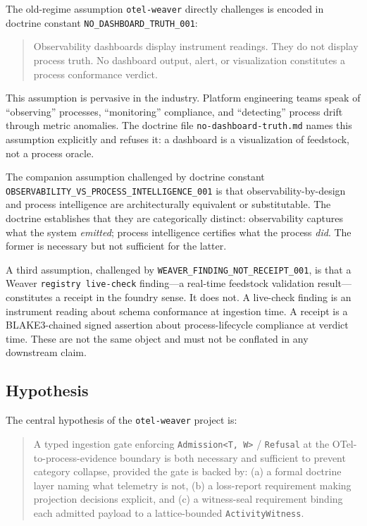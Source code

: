 The old-regime assumption \texttt{otel-weaver} directly challenges is encoded in doctrine constant
\texttt{NO\_DASHBOARD\_TRUTH\_001}:

\begin{quote}
  Observability dashboards display instrument readings. They do not display process truth.
  No dashboard output, alert, or visualization constitutes a process conformance verdict.
\end{quote}

This assumption is pervasive in the industry. Platform engineering teams speak of ``observing''
processes, ``monitoring'' compliance, and ``detecting'' process drift through metric anomalies.
The doctrine file \texttt{no-dashboard-truth.md} names this assumption explicitly and refuses it:
a dashboard is a visualization of feedstock, not a process oracle.

The companion assumption challenged by doctrine constant
\texttt{OBSERVABILITY\_VS\_PROCESS\_INTELLIGENCE\_001} is that observability-by-design and
process intelligence are architecturally equivalent or substitutable. The doctrine establishes
that they are categorically distinct: observability captures what the system \emph{emitted};
process intelligence certifies what the process \emph{did}. The former is necessary but not
sufficient for the latter.

A third assumption, challenged by \texttt{WEAVER\_FINDING\_NOT\_RECEIPT\_001}, is that a Weaver
\texttt{registry live-check} finding---a real-time feedstock validation result---constitutes a
receipt in the foundry sense. It does not. A live-check finding is an instrument reading about
schema conformance at ingestion time. A receipt is a BLAKE3-chained signed assertion about
process-lifecycle compliance at verdict time. These are not the same object and must not be
conflated in any downstream claim.

\subsection{Hypothesis}
\label{sec:otel-weaver-rq-hypothesis}

The central hypothesis of the \texttt{otel-weaver} project is:

\begin{quote}
  A typed ingestion gate enforcing \texttt{Admission<T,\,W>} / \texttt{Refusal} at the
  OTel-to-process-evidence boundary is both necessary and sufficient to prevent category collapse,
  provided the gate is backed by: (a) a formal doctrine layer naming what telemetry is not,
  (b) a loss-report requirement making projection decisions explicit, and (c) a witness-seal
  requirement binding each admitted payload to a lattice-bounded \texttt{ActivityWitness}.
\end{quote}

